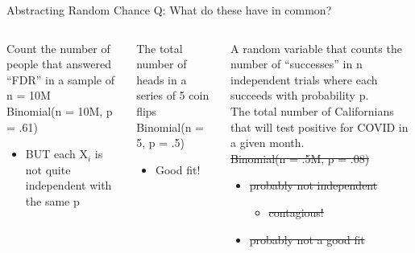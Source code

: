 \documentclass[aspectratio=169]{../latex_main/tntbeamer}  %
\begin{document}
	
	
	\begin{frame}[c]{Abstracting Random Chance}
	    Q: What do these have in common?\\
	    \bigskip
	    \begin{columns}
	        \begin{column}{.3\textwidth}
	            Count the number of people that answered “FDR” in a sample of n = 10M\\
	            \bigskip
	            Binomial(n = 10M, p = .61)
	            \begin{itemize}
	                \item BUT each X$_i$ is not quite independent with the same p

	            \end{itemize}
	        \end{column}
	        
	        \begin{column}{.3\textwidth}
	          The total number of heads in a series of 5 coin flips\\
	          \bigskip
	          Binomial(n = 5, p = .5)
	          \begin{itemize}
	              \item Good fit!
	          \end{itemize}

	        \end{column}
	        
	        \begin{column}{.4\textwidth}
	          A random variable that counts the number of “successes” in n independent trials where each succeeds with probability p.\\
	          \bigskip
	          The total number of Californians that will test positive for COVID in a given month.\\
              \sout{Binomial(n = .5M, p = .08)}
              \begin{itemize}
                  \item \sout{probably not independent}
                  \begin{itemize}
                  \item \sout{contagious!}
                  \end{itemize}
                  \item \sout{probably not a good fit}
              \end{itemize}


	        \end{column}
	    \end{columns}
	\end{frame}
	
\end{document}

